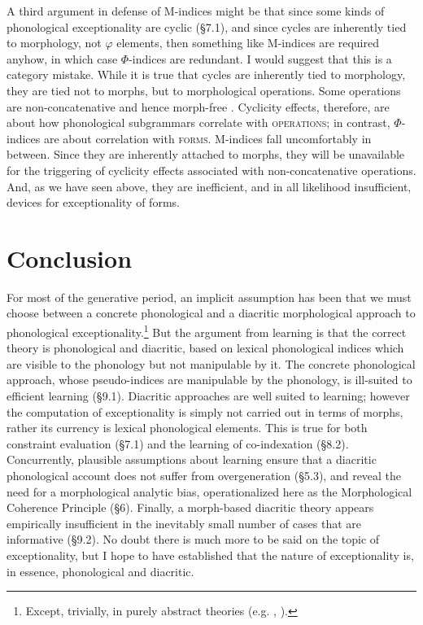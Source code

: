 \documentclass[output=paper,
modfonts
]{LSP/langsci}
\begin{document}
A third argument in defense of M-indices might be that since some kinds of phonological exceptionality are cyclic (§7.1), and since cycles are inherently tied to morphology, not $\varphi $ elements, then something like M-indices are required anyhow, in which case $\Phi $-indices are redundant. I would suggest that this is a category mistake. While it is true that cycles are inherently tied to morphology, they are tied not to morphs, but to morphological operations. Some operations are non-concatenative and hence morph-free \citep{anderson1992}. Cyclicity effects, therefore, are about how phonological subgrammars correlate with \textsc{operations}; in contrast, $\Phi $-indices are about correlation with \textsc{forms}. M-indices fall uncomfortably in between. Since they are inherently attached to morphs, they will be unavailable for the triggering of cyclicity effects associated with non-concatenative operations. And, as we have seen above, they are inefficient, and in all likelihood insufficient, devices for exceptionality of forms.

\section[Conclusion]{Conclusion}

For most of the generative period, an implicit assumption has been that we must choose between a concrete phonological and a diacritic morphological approach to phonological exceptionality.\footnote{Except, trivially, in purely abstract theories (e.g. \citealt{lamb1966}, \citealt{fudge1967}).} But the argument from learning is that the correct theory is phonological and diacritic, based on lexical phonological indices which are visible to the phonology but not manipulable by it. The concrete phonological approach, whose pseudo-indices are manipulable by the phonology, is ill-suited to efficient learning (§9.1). Diacritic approaches are well suited to learning; however the computation of exceptionality is simply not carried out in terms of morphs, rather its currency is lexical phonological elements. This is true for both constraint evaluation (§7.1) and the learning of co-indexation (§8.2). Concurrently, plausible assumptions about learning ensure that a diacritic phonological account does not suffer from overgeneration (§5.3), and reveal the need for a morphological analytic bias, operationalized here as the Morphological Coherence Principle (§6). Finally, a morph-based diacritic theory appears empirically insufficient in the inevitably small number of cases that are informative (§9.2). No doubt there is much more to be said on the topic of exceptionality, but I hope to have established that the nature of exceptionality is, in essence, phonological and diacritic.
\end{document}
